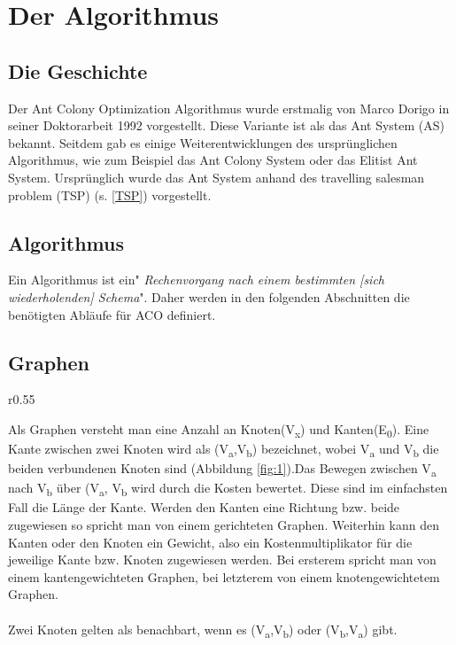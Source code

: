 \documentclass[12pt]{article}
\begin{document}
\section{Der Algorithmus}
\subsection{Die Geschichte}\label{Geschichte}
Der Ant Colony Optimization Algorithmus wurde erstmalig von Marco Dorigo in seiner Doktorarbeit 1992 vorgestellt. Diese Variante ist als das Ant System (AS) bekannt. Seitdem gab es einige Weiterentwicklungen des ursprünglichen Algorithmus, wie zum Beispiel das Ant Colony System oder das Elitist Ant System.
Ursprünglich wurde das Ant System anhand des travelling salesman problem (TSP) (s. \ref{TSP}) vorgestellt.
\subsection{Algorithmus}
Ein Algorithmus ist ein"\textit{ Rechenvorgang nach einem bestimmten [sich wiederholenden] Schema}"\cite{duden_algo}. Daher werden in den folgenden Abschnitten die benötigten Abläufe für ACO definiert.
\subsection{Graphen}
\begin{wrapfigure}{r}{0.55\textwidth}
\centering
{}
\caption{Einfacher Graph}
\label{fig:1}
\end{wrapfigure}
Als Graphen versteht man eine Anzahl an Knoten(V\textsubscript{x}) und Kanten(E\textsubscript{0}). Eine Kante zwischen zwei Knoten wird als (V\textsubscript{a},V\textsubscript{b}) bezeichnet, wobei V\textsubscript{a} und V\textsubscript{b} die beiden verbundenen Knoten sind (Abbildung \ref{fig:1}).Das Bewegen zwischen V\textsubscript{a} nach V\textsubscript{b} über (V\textsubscript{a}, V\textsubscript{b} wird durch die Kosten bewertet. Diese sind im einfachsten Fall die Länge der Kante. Werden den Kanten eine Richtung bzw. beide zugewiesen so spricht man von einem gerichteten Graphen. Weiterhin kann den Kanten oder den Knoten ein Gewicht, also ein Kostenmultiplikator für die jeweilige Kante bzw. Knoten zugewiesen werden. Bei ersterem spricht man von einem kantengewichteten Graphen, bei letzterem von einem knotengewichtetem Graphen.\\\\
Zwei Knoten gelten als benachbart, wenn es (V\textsubscript{a},V\textsubscript{b}) oder (V\textsubscript{b},V\textsubscript{a}) gibt.
\end{document}
